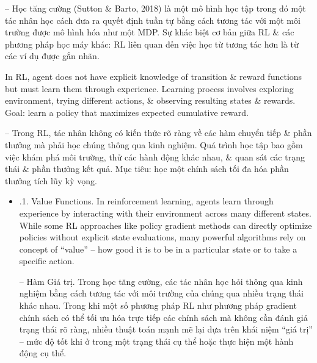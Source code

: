 \documentclass{article}
\begin{document}
\begin{itemize}
\begin{itemize}
        -- Học tăng cường (Sutton \& Barto, 2018) là một mô hình học tập trong đó một tác nhân học cách đưa ra quyết định tuần tự bằng cách tương tác với một môi trường được mô hình hóa như một MDP. Sự khác biệt cơ bản giữa RL \& các phương pháp học máy khác: RL liên quan đến việc học từ tương tác hơn là từ các ví dụ được gắn nhãn.

        In RL, agent does not have explicit knowledge of transition \& reward functions but must learn them through experience. Learning process involves exploring environment, trying different actions, \& observing resulting states \& rewards. Goal: learn a policy that maximizes expected cumulative reward.

        -- Trong RL, tác nhân không có kiến thức rõ ràng về các hàm chuyển tiếp \& phần thưởng mà phải học chúng thông qua kinh nghiệm. Quá trình học tập bao gồm việc khám phá môi trường, thử các hành động khác nhau, \& quan sát các trạng thái \& phần thưởng kết quả. Mục tiêu: học một chính sách tối đa hóa phần thưởng tích lũy kỳ vọng.
        \begin{itemize}
            \item {.1. Value Functions.} In reinforcement learning, agents learn through experience by interacting with their environment across many different states. While some RL approaches like policy gradient methods can directly optimize policies without explicit state evaluations, many powerful algorithms rely on concept of ``value'' -- how good it is to be in a particular state or to take a specific action.

            -- {\sf Hàm Giá trị.} Trong học tăng cường, các tác nhân học hỏi thông qua kinh nghiệm bằng cách tương tác với môi trường của chúng qua nhiều trạng thái khác nhau. Trong khi một số phương pháp RL như phương pháp gradient chính sách có thể tối ưu hóa trực tiếp các chính sách mà không cần đánh giá trạng thái rõ ràng, nhiều thuật toán mạnh mẽ lại dựa trên khái niệm ``giá trị'' -- mức độ tốt khi ở trong một trạng thái cụ thể hoặc thực hiện một hành động cụ thể.


\end{itemize}
\end{itemize}
\end{itemize}
\end{document}
